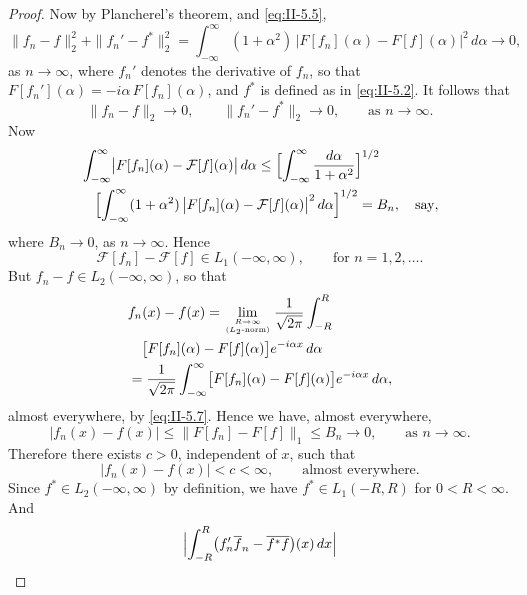 \begin{proof}
Now by Plancherel's theorem, and \eqref{eq:II-5.5},
\[
\|f_{n}-f\|_{2}^{2}+\|f_{n}'-f^{*}\|_{2}^{2}
=\int_{-\infty}^{\infty}(1+\alpha^{2})\,
\bigl|F[f_{n}](\alpha)-F[f](\alpha)\bigr|^{2}\,d\alpha\to 0,
\]
as $n\to\infty$, where $f_{n}'$ denotes the derivative of $f_{n}$, so that $F[f_{n}'](\alpha)=-i\alpha\,F[f_{n}](\alpha)$, and $f^{*}$ is defined as in \eqref{eq:II-5.2}. It follows that
\begin{equation}\tag{5.6}\label{eq:II-5.6}
\|f_{n}-f\|_{2}\to 0,\qquad \|f_{n}'-f^{*}\|_{2}\to 0,\qquad\text{as }n\to\infty.
\end{equation}
Now
\[
\begin{aligned}
&\int_{-\infty}^{\infty}\bigl|F[f_{n}](\alpha)-\mathcal F[f](\alpha)\bigr|\,d\alpha
\le \Bigl[\int_{-\infty}^{\infty}\frac{d\alpha}{1+\alpha^{2}}\Bigr]^{1/2}\\
&\quad\Bigl[\int_{-\infty}^{\infty}(1+\alpha^{2})\,
\bigl|F[f_{n}](\alpha)-\mathcal F[f](\alpha)\bigr|^{2}\,d\alpha\Bigr]^{1/2}=B_{n},\quad\text{say},
\end{aligned}
\]
where $B_{n}\to 0$, as $n\to\infty$. Hence
\begin{equation}\tag{5.7}\label{eq:II-5.7}
\mathcal F[f_{n}]-\mathcal F[f]\in L_{1}(-\infty,\infty),\qquad\text{for }n=1,2,\dots.
\end{equation}
But $f_{n}-f\in L_{2}(-\infty,\infty)$, so that
\[
\begin{aligned}
&f_{n}(x) - f(x) = \lim_{R\to\infty\atop(L_{2}\text{-norm})} \frac{1}{\sqrt{2\pi}}  \int_{-R}^{R}\\
&\quad \bigl[F[f_{n}](\alpha)-F[f](\alpha)\bigr]e^{-i\alpha x}\,d\alpha\\
&= \frac{1}{\sqrt{2\pi}}  \int_{-\infty}^{\infty}  \bigl[F[f_{n}](\alpha)-F[f](\alpha)\bigr]e^{-i\alpha x}\,d\alpha,
\end{aligned}
\]
almost everywhere, by \eqref{eq:II-5.7}. Hence we have, almost everywhere,
\begin{equation}\tag{5.7'}\label{eq:II-5.7p}
|f_{n}(x)-f(x)|\le \|F[f_{n}]-F[f]\|_{1}\le B_{n}\to 0,\qquad\text{as }n\to\infty.
\end{equation}
Therefore there exists $c>0$, independent of $x$, such that
\begin{equation}\tag{5.8}\label{eq:II-5.8}
|f_{n}(x)-f(x)|<c<\infty,\qquad\text{almost everywhere}.
\end{equation}
Since $f^{*}\in L_{2}(-\infty,\infty)$ by definition, we have $f^{*}\in L_{1}(-R,R)$ for $0<R<\infty$. And
\[
\Bigl|\int_{-R}^{R}\bigl(f_{n}'\overline{f}_{n}-\overline{f^{*}}\overline{f}\bigr)(x)\,dx\Bigr|
\]
\end{proof}
